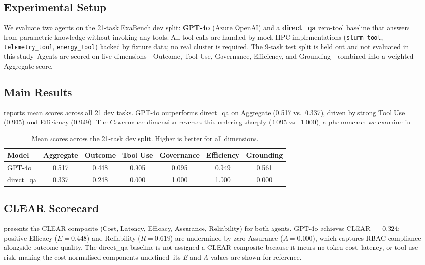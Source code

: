 \documentclass[12pt]{article}
\begin{document}
\subsection{Experimental Setup}

We evaluate two agents on the 21-task ExaBench dev split: \textbf{GPT-4o}
(Azure OpenAI) and a \textbf{direct\_qa} zero-tool baseline that answers from
parametric knowledge without invoking any tools. All tool calls are handled by
mock HPC implementations (\texttt{slurm\_tool}, \texttt{telemetry\_tool},
\texttt{energy\_tool}) backed by fixture data; no real cluster is required.
The 9-task test split is held out and not evaluated in this study. Agents are
scored on five dimensions---Outcome, Tool Use, Governance, Efficiency, and
Grounding---combined into a weighted Aggregate score.

\subsection{Main Results}

 reports mean scores across all 21 dev tasks. GPT-4o
outperforms direct\_qa on Aggregate (0.517 vs.\ 0.337), driven by strong
Tool Use (0.905) and Efficiency (0.949). The Governance dimension reverses
this ordering sharply (0.095 vs.\ 1.000), a phenomenon we examine in
.

\begin{table}[ht]
\centering
\caption{Mean scores across the 21-task dev split. Higher is better for all dimensions.}
\label{tab:main}
\begin{tabular}{lcccccc}
\toprule
\textbf{Model} & \textbf{Aggregate} & \textbf{Outcome} & \textbf{Tool Use}
  & \textbf{Governance} & \textbf{Efficiency} & \textbf{Grounding} \\
\midrule
GPT-4o     & 0.517 & 0.448 & 0.905 & 0.095 & 0.949 & 0.561 \\
direct\_qa & 0.337 & 0.248 & 0.000 & 1.000 & 1.000 & 0.000 \\
\bottomrule
\end{tabular}
\end{table}

\subsection{CLEAR Scorecard}

 presents the CLEAR composite (Cost, Latency, Efficacy,
Assurance, Reliability) for both agents. GPT-4o achieves CLEAR~=~0.324;
positive Efficacy ($E=0.448$) and Reliability ($R=0.619$) are undermined by
zero Assurance ($A=0.000$), which captures RBAC compliance alongside outcome
quality. The direct\_qa baseline is not assigned a CLEAR composite because it
incurs no token cost, latency, or tool-use risk, making the cost-normalised
components undefined; its $E$ and $A$ values are shown for reference.
\end{document}
